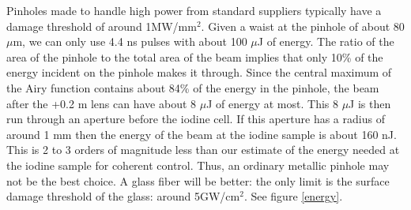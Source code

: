 Pinholes made to handle high power from standard suppliers typically have a damage threshold of around 1MW/mm$^2$. Given a waist at the pinhole of about 80 $\mu$m, we can only use 4.4 ns pulses with about 100 $\mu$J of energy. The ratio of the area of the pinhole to the total area of the beam implies that only 10\% of the energy incident on the pinhole makes it through. Since the central maximum of the Airy function contains about 84\% of the energy in the pinhole, the beam after the +0.2 m lens can have about 8 $\mu$J of energy at most. This 8 $\mu$J is then run through an aperture before the iodine cell. If this aperture has a radius of around 1 mm then the energy of the beam at the iodine sample is about 160 nJ. This is 2 to 3 orders of magnitude less than our estimate of the energy needed at the iodine sample for coherent control. Thus, an ordinary metallic pinhole may not be the best choice. A glass fiber will be better: the only limit is the surface damage threshold of the glass: around 5GW/cm$^2$. See figure \ref{energy}.

